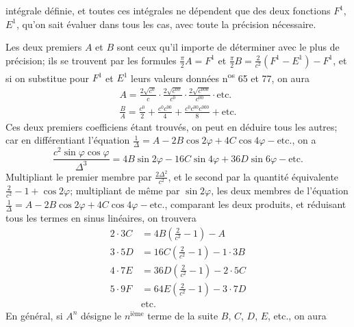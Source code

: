 \documentclass{article}
\begin{document}
intégrale définie, et toutes ces intégrales ne dépendent que des deux fonctions $F^{1}$, $E^{1}$, qu'on sait évaluer dans tous les cas, avec toute la précision nécessaire.

Les deux premiers $A$ et $B$ sont ceux qu'il importe de déterminer avec le plus de précision; ils se trouvent par les formules $\frac{\pi}{2}A=F^{1}$ et $\frac{\pi}{2}B=\frac{2}{c^{2}}(F^{1}-E^{1})-F^{1}$, et si on substitue pour $F^{1}$ et $E^{1}$ leurs valeurs données n\textsuperscript{os} 65 et 77, on aura
\[ \begin{gathered} A=\frac{2\sqrt{c^{0}}}{c}\cdot\frac{2\sqrt{c^{00}}}{c^{0}}\cdot\frac{2\sqrt{c^{000}}}{c^{00}}\cdot\text{etc.}\\ \frac{B}{A}=\frac{c^{0}}{2}+\frac{c^{0}c^{00}}{4}+\frac{c^{0}c^{00}c^{000}}{8}+\text{etc.} \end{gathered} \]
Ces deux premiers coefficiens étant trouvés, on peut en déduire tous les autres; car en différentiant l'équation $\frac{1}{\Delta}=A-2B\cos2\varphi+4C\cos4\varphi-\text{etc.}$, on a
\[ \frac{c^{2}\sin\varphi\cos\varphi}{\Delta^{3}}=4B\sin2\varphi-16C\sin4\varphi+36D\sin6\varphi-\text{etc.} \]
Multipliant le premier membre par $\frac{2\Delta^{2}}{c^{2}}$, et le second par la quantité équivalente $\frac{2}{c^{2}}-1+\cos2\varphi$; multipliant de même par $\sin2\varphi$, les deux membres de l'équation $\frac{1}{\Delta}=A-2B\cos2\varphi+4C\cos4\varphi-\text{etc.}$, comparant les deux produits, et réduisant tous les termes en sinus linéaires, on trouvera
\[ \begin{aligned} 2\cdot3C&=4B\left(\frac{2}{c^{2}}-1\right)-A\\ 3\cdot5D&=16C\left(\frac{2}{c^{2}}-1\right)-1\cdot3B\\ 4\cdot7E&=36D\left(\frac{2}{c^{2}}-1\right)-2\cdot5C\\ 5\cdot9F&=64E\left(\frac{2}{c^{2}}-1\right)-3\cdot7D\\ &\text{etc.} \end{aligned} \]
En général, si $A^{n}$ désigne le $n^{\text{ième}}$ terme de la suite $B$, $C$, $D$, $E$, etc., on aura
\end{document}
